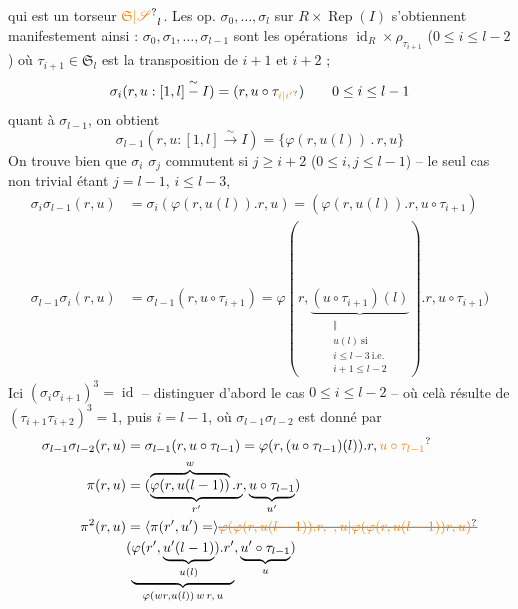 qui est un torseur   $\unsure{\mathfrak S|\mathscr S}_l$. Les op. $\sigma_0,\ldots,\sigma_l$ sur $R\times\operatorname{Rep}(I)$ s'obtiennent manifestement ainsi : $\sigma_0,\sigma_1,\ldots,\sigma_{l-1}$ sont les opérations $\operatorname{id}_R\times\rho_{\tau_{i+1}}$ ($0\leq i\leq l-2$) où $\tau_{i+1}\in\mathfrak S_l$ est la transposition de $i+1$ et $i+2$ ; 
\[
\sigma_i(r,u:[1,l]\overset{\sim}{-}I)=(r,u\circ\tau_{\unsure{i|i'}})\qquad 0\leq i\leq l-1
\]
quant à $\sigma_{l-1}$, on obtient
\[
\sigma_{l-1}(r,u:[1,l]\xrightarrow{\sim}I)=\{\varphi(r,u(l))\mathbin{.}r,u\}
\]
On trouve bien que  $\sigma_i$ $\sigma_j$ commutent si $j\geq i+2$ ($0\leq i,j\leq l-1$) -- le seul cas non  trivial étant $j=l-1$, $i\leq l-3$,
\[
\begin{aligned}
\sigma_i\sigma_{l-1}(r,u)&=\sigma_i(\varphi(r,u(l)).r,u)=(\varphi(r,u(l)).r,u\circ\tau_{i+1})\\
\sigma_{l-1}\sigma_i(r,u)&=\sigma_{l-1}(r,u\circ\tau_{i+1})
=\varphi(r,\underbrace{(u\circ\tau_{i+1})(l)}_{\substack{\Vert\\u(l)\ \text{si}\\i\leq l-3\ \text{i.e.}\\i+1\leq l-2}}).r,u\circ\tau_{i+1})
\end{aligned}
\]
Ici $(\sigma_i\sigma_{i+1})^3=\operatorname{id}$ -- distinguer d'abord le cas $0\leq i\leq l-2$ -- où celà résulte de $(\tau_{i+1}\tau_{i+2})^3=1$, puis $i=l-1$, où $\sigma_{l-1}\sigma_{l-2}$ est donné par
\[
\begin{aligned}
\sigma_{l-1}\sigma_{l-2}(r,u)&=\sigma_{l-1}(r,u\circ\tau_{l-1})=\varphi(r,(u\circ\tau_{l-1})(l)).r,\unsure{u\circ\tau_{l-1}}\\
\pi(r,u)&=(\underbrace{\overbrace{\varphi(r,u(l-1))}^{w}.r}_{r'},\underbrace{u\circ\tau_{l-1}}_{u'})\\
\pi^2(r,u)&=\inserted{\pi(r',u')=}\deleted{\unsure{\varphi(\varphi(r,u(l-1)).r,\ ,u|\varphi(\varphi(r,u(l-1))r,u)}}\\
&(\underbrace{\varphi(r',\underbrace{u'(l-1)}_{u(l)}).r'}_{\varphi(wr,u(l))\,w\,r,\,u},\underbrace{u'\circ\tau_{l-1}}_{u})
\end{aligned}
\]

